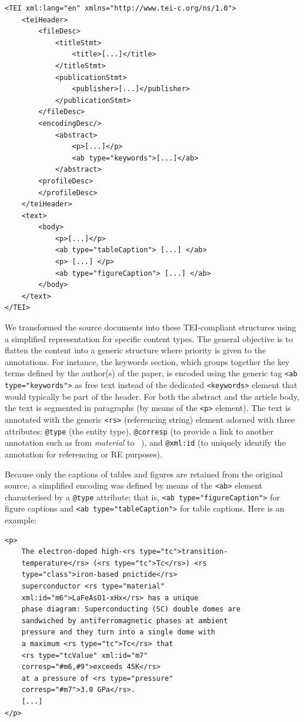 \begin{verbatim}
<TEI xml:lang="en" xmlns="http://www.tei-c.org/ns/1.0">
    <teiHeader>
        <fileDesc>
            <titleStmt>
                <title>[...]</title>
            </titleStmt>
            <publicationStmt>
                <publisher>[...]</publisher>
            </publicationStmt>
        </fileDesc>
        <encodingDesc/>
            <abstract>
                <p>[...]</p>
                <ab type="keywords">[...]</ab>
            </abstract>
        <profileDesc>
        </profileDesc>
    </teiHeader>
    <text>
        <body>
            <p>[...]</p>
            <ab type="tableCaption"> [...] </ab>
            <p> [...] </p>
            <ab type="figureCaption"> [...] </ab> 
        </body>
    </text>
</TEI>
\end{verbatim}

We transformed the source documents into these TEI-compliant structures using a simplified representation for specific content types.
The general objective is to flatten the content into a generic structure where priority is given to the annotations.
For instance, the keywords section, which groups together the key terms defined by the author(s) of the paper, is encoded using the generic tag \texttt{<ab type="keywords">} as free text instead of the dedicated \texttt{<keywords>} element that would typically be part of the header. 
For both the abstract and the article body, the text is segmented in paragraphs (by means of the \texttt{<p>} element). 
The text is annotated with the generic \texttt{<rs>} (referencing string) element adorned with three attributes: \texttt{@type} (the entity type), \texttt{@corresp} (to provide a link to another annotation such as from \textit{material} to \tc~), and \texttt{@xml:id} (to uniquely identify the annotation for referencing or RE purposes).

Because only the captions of tables and figures are retained from the original source, a simplified encoding was defined by means of the \texttt{<ab>} element characterised by a \texttt{@type} attribute; that is, \texttt{<ab type="figureCaption">} for figure captions and \texttt{<ab type="tableCaption">} for table captions. 
Here is an example: 

\begin{verbatim}
<p>
    The electron-doped high-<rs type="tc">transition-
    temperature</rs> (<rs type="tc">Tc</rs>) <rs 
    type="class">iron-based pnictide</rs> 
    superconductor <rs type="material" 
    xml:id="m6">LaFeAsO1-xHx</rs> has a unique 
    phase diagram: Superconducting (SC) double domes are 
    sandwiched by antiferromagnetic phases at ambient 
    pressure and they turn into a single dome with 
    a maximum <rs type="tc">Tc</rs> that 
    <rs type="tcValue" xml:id="m7" 
    corresp="#m6,#9">exceeds 45K</rs> 
    at a pressure of <rs type="pressure" 
    corresp="#m7">3.0 GPa</rs>. 
    [...]
</p>
\end{verbatim}

